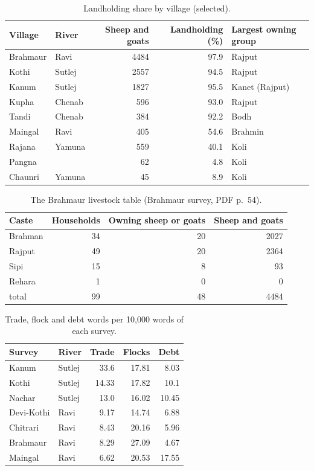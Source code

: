 \documentclass[11pt,a4paper]{article}
\begin{document}
\begin{table}[h]\centering\small
\caption{Landholding share by village (selected).}\label{tab:own}
\begin{tabular}{llrrl}\toprule
Village & River & Sheep and goats & Landholding (\%) & Largest owning group\\\midrule
Brahmaur & Ravi & 4484 & 97.9 & Rajput\\
Kothi & Sutlej & 2557 & 94.5 & Rajput\\
Kanum & Sutlej & 1827 & 95.5 & Kanet (Rajput)\\
Kupha & Chenab & 596 & 93.0 & Rajput\\
Tandi & Chenab & 384 & 92.2 & Bodh\\
Maingal & Ravi & 405 & 54.6 & Brahmin\\
Rajana & Yamuna & 559 & 40.1 & Koli\\
Pangna & & 62 & 4.8 & Koli\\
Chaunri & Yamuna & 45 & 8.9 & Koli\\
\bottomrule\end{tabular}
\end{table}

\begin{table}[h]\centering\small
\caption{The Brahmaur livestock table (Brahmaur survey, PDF p.~54).}\label{tab:brahmaur}
\begin{tabular}{lrrr}\toprule
Caste & Households & Owning sheep or goats & Sheep and goats\\\midrule
Brahman & 34 & 20 & 2027\\
Rajput & 49 & 20 & 2364\\
Sipi & 15 & 8 & 93\\
Rehara & 1 & 0 & 0\\
total & 99 & 48 & 4484\\
\bottomrule\end{tabular}
\end{table}

\begin{table}[h]\centering\small
\caption{Trade, flock and debt words per 10,000 words of each survey.}\label{tab:trade}
\begin{tabular}{llrrr}\toprule
Survey & River & Trade & Flocks & Debt\\\midrule
Kanum & Sutlej & 33.6 & 17.81 & 8.03\\
Kothi & Sutlej & 14.33 & 17.82 & 10.1\\
Nachar & Sutlej & 13.0 & 16.02 & 10.45\\
Devi-Kothi & Ravi & 9.17 & 14.74 & 6.88\\
Chitrari & Ravi & 8.43 & 20.16 & 5.96\\
Brahmaur & Ravi & 8.29 & 27.09 & 4.67\\
Maingal & Ravi & 6.62 & 20.53 & 17.55\\
\bottomrule\end{tabular}
\end{table}
\end{document}
